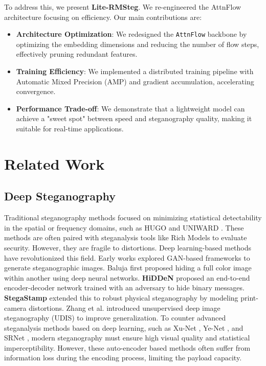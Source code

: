 \documentclass[10pt,twocolumn,letterpaper]{article}
\begin{document}
To address this, we present \textbf{Lite-RMSteg}. We re-engineered the AttnFlow architecture focusing on efficiency. Our main contributions are:
\begin{itemize}
    \item \textbf{Architecture Optimization}: We redesigned the \texttt{AttnFlow} backbone by optimizing the embedding dimensions and reducing the number of flow steps, effectively pruning redundant features.
    \item \textbf{Training Efficiency}: We implemented a distributed training pipeline with Automatic Mixed Precision (AMP) and gradient accumulation, accelerating convergence.
    \item \textbf{Performance Trade-off}: We demonstrate that a lightweight model can achieve a "sweet spot" between speed and steganography quality, making it suitable for real-time applications.
\end{itemize}

\section{Related Work}
\label{sec:related}

\subsection{Deep Steganography}
Traditional steganography methods focused on minimizing statistical detectability in the spatial or frequency domains, such as HUGO \cite{hugo} and UNIWARD \cite{uniward}. These methods are often paired with steganalysis tools like Rich Models \cite{rich_models} to evaluate security. However, they are fragile to distortions.
Deep learning-based methods have revolutionized this field. Early works explored GAN-based frameworks \cite{sgan, hayes_gan, tang_adv} to generate steganographic images. Baluja \cite{baluja2017} first proposed hiding a full color image within another using deep neural networks. \textbf{HiDDeN} \cite{hidden} proposed an end-to-end encoder-decoder network trained with an adversary to hide binary messages. \textbf{StegaStamp} \cite{stegastamp} extended this to robust physical steganography by modeling print-camera distortions. Zhang et al. \cite{udis} introduced unsupervised deep image steganography (UDIS) to improve generalization. To counter advanced steganalysis methods based on deep learning, such as Xu-Net \cite{xu_net}, Ye-Net \cite{ye_net}, and SRNet \cite{srnet}, modern steganography must ensure high visual quality and statistical imperceptibility. However, these auto-encoder based methods often suffer from information loss during the encoding process, limiting the payload capacity.
\end{document}
